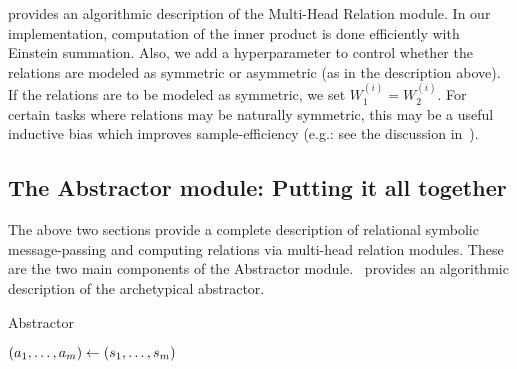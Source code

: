  provides an algorithmic description of the Multi-Head Relation module. In our implementation, computation of the inner product is done efficiently with Einstein summation. Also, we add a hyperparameter to control whether the relations are modeled as symmetric or asymmetric (as in the description above). If the relations are to be modeled as symmetric, we set $W_1^{(i)} = W_2^{(i)}$. For certain tasks where relations may be naturally symmetric, this may be a useful inductive bias which improves sample-efficiency (e.g.: see the discussion in~\cite{kerg2022neural}).

\subsection{The Abstractor module: Putting it all together}

The above two sections provide a complete description of relational symbolic message-passing and computing relations via multi-head relation modules. These are the two main components of the Abstractor module.~ provides an algorithmic description of the archetypical abstractor.

\begin{algorithm}[ht!]
	\caption{Abstractor}\label{alg:abstractor}

	\vspace{1em}

	\((a_1, \ldots, a_m) \gets (s_1, \ldots, s_m)\)

\end{algorithm}

